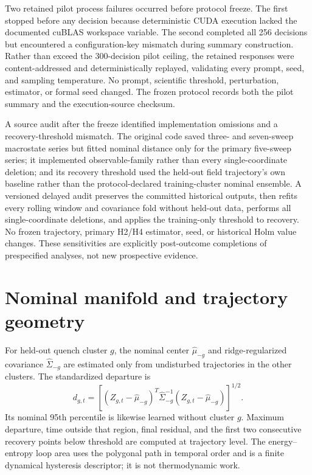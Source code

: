 \documentclass[12pt]{article}
\begin{document}
Two retained pilot process failures occurred before protocol freeze. The first
stopped before any decision because deterministic CUDA execution lacked the
documented cuBLAS workspace variable. The second completed all 256 decisions
but encountered a configuration-key mismatch during summary construction.
Rather than exceed the 300-decision pilot ceiling, the retained responses were
content-addressed and deterministically replayed, validating every prompt,
seed, and sampling temperature. No prompt, scientific threshold, perturbation,
estimator, or formal seed changed. The frozen protocol records both the pilot
summary and the execution-source checksum.

A source audit after the freeze identified implementation omissions and a
recovery-threshold mismatch. The original code saved three- and seven-sweep
macrostate series but fitted nominal distance only for the primary five-sweep
series; it implemented observable-family rather than every single-coordinate
deletion; and its recovery threshold used the held-out field trajectory's own
baseline rather than the protocol-declared training-cluster nominal ensemble.
A versioned delayed audit preserves the committed historical outputs, then
refits every rolling window and covariance fold without held-out data, performs
all single-coordinate deletions, and applies the training-only threshold to
recovery. No frozen trajectory, primary H2/H4 estimator, seed, or historical
Holm value changes. These sensitivities are explicitly post-outcome completions
of prespecified analyses, not new prospective evidence.

\section{Nominal manifold and trajectory geometry}

For held-out quench cluster $g$, the nominal center $\widehat\mu_{-g}$ and
ridge-regularized covariance $\widehat\Sigma_{-g}$ are estimated only from
undisturbed trajectories in the other clusters.  The standardized departure is
\begin{equation}
d_{g,t}=\left[(Z_{g,t}-\widehat\mu_{-g})^T
\widehat\Sigma_{-g}^{-1}(Z_{g,t}-\widehat\mu_{-g})\right]^{1/2}.
\end{equation}
Its nominal 95th percentile is likewise learned without cluster $g$.
Maximum departure, time outside that region, final residual, and the first two
consecutive recovery points below threshold are computed at trajectory level.
The energy--entropy loop area uses the polygonal path in temporal order and is
a finite dynamical hysteresis descriptor; it is not thermodynamic work.
\end{document}
